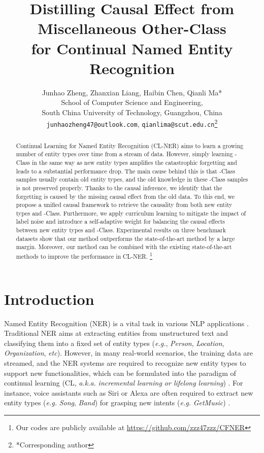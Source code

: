 \documentclass[11pt]{article}
\title{Distilling Causal Effect from Miscellaneous Other-Class\\ for Continual Named Entity Recognition}
\author{Junhao Zheng, Zhanxian Liang, Haibin Chen, Qianli Ma*\\
  School of Computer Science and Engineering, \\
  South China University of Technology, Guangzhou, China\\
  \texttt{junhaozheng47@outlook.com}, 
  \texttt{qianlima@scut.edu.cn}\thanks{*Corresponding author}}
\begin{document}
\maketitle
\begin{abstract}
Continual Learning for Named Entity Recognition (CL-NER) aims to learn a growing number of entity types over time from a stream of data.
However, simply learning -Class in the same way as new entity types amplifies the catastrophic forgetting and leads to a substantial performance drop.
The main cause behind this is that -Class samples usually contain old entity types, and the old knowledge in these -Class samples is not preserved properly.
Thanks to the causal inference, we identify that the forgetting is caused by the missing causal effect from the old data.
To this end, we propose a unified causal framework to retrieve the causality from both new entity types and -Class.
Furthermore, we apply curriculum learning to mitigate the impact of label noise and introduce a self-adaptive weight for balancing the causal effects between new entity types and -Class.
Experimental results on three benchmark datasets show that our method outperforms the state-of-the-art method by a large margin.
Moreover, our method can be combined with the existing state-of-the-art methods to improve the performance in CL-NER. \footnote{Our codes are publicly available at \href{https://github.com/zzz47zzz/CFNER}{https://github.com/zzz47zzz/CFNER}}
\end{abstract}

\section{Introduction}
Named Entity Recognition (NER) is a vital task in various NLP applications \citep{ma2016end}.
Traditional NER aims at extracting entities from unstructured text and classifying them into a fixed set of entity types (\textit{e.g.}, \textit{Person}, \textit{Location}, \textit{Organization}, \textit{etc}).
However, in many real-world scenarios, the training data are streamed, and the NER systems are required to recognize new entity types to support new functionalities, which can be formulated into the paradigm of continual learning  (CL, \textit{a.k.a.} \textit{incremental learning or lifelong learning}) \citep{thrun1998lifelong,parisi2019continual}.
For instance, voice assistants such as Siri or Alexa are often required to extract new entity types (\textit{e.g.} \textit{Song}, \textit{Band}) for grasping new intents (\textit{e.g.} \textit{GetMusic}) \citep{monaikul2021continual}.
\end{document}
